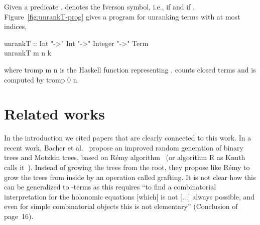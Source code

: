 \documentclass{sig-alternate}
\begin{document}
\begin{figure*}[!t]
Given a predicate ,  denotes the Iverson symbol, i.e.,  if  and  if .
Figure~\ref{fig:unrankT-prog} gives a program for unranking terms with at most  indices,
\ifICFP
\begin{figure*}[!th]
  \begin{center}
    \begin{normalsize}
      \begin{haskell}
        unrankT :: Int "->" Int "->" Integer "->" Term\\
        unrankT m n k \\
\hspace*{10pt}
      \end{haskell}
    \end{normalsize}
\end{center}
  \caption{\emph{unrankT} function in \textsf{Haskell}.}
  \label{fig:unrankT-prog}
\end{figure*}
\fi
where \<tromp m n\> is the \textsf{Haskell} function representing .
 counts closed terms and is computed by \<tromp 0 n\>.

\section{Related works}
\label{sec:works}

In the introduction we cited papers that are clearly connected to this work.  In a
recent work, Bacher et al.~\cite{DBLP:journals/corr/BacherBJ14} propose an improved
random generation of binary trees and Motzkin trees, based on R\'{e}my algorithm~\cite{DBLP:journals/ita/Remy85} (or
algorithm R as Knuth calls it~\cite{KnuthVol4_4}).  Instead of growing the trees from the root, they
propose like R\'{e}my to grow the trees from inside by an operation called grafting.
It is not clear how this can be generalized to -terms as this requires ``to find a
combinatorial interpretation for the holonomic equations [which] is not [...]
always possible, and even for simple combinatorial objects this is not elementary''
(Conclusion of \cite{DBLP:journals/corr/BacherBJ14} page~16).  


\end{figure*}
\end{document}
